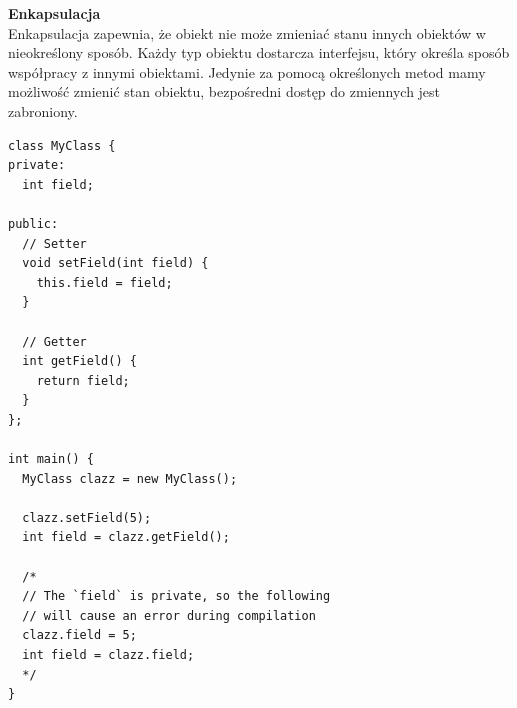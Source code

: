 \documentclass[12pt]{article}
\begin{document}
    \begin{definition}
    \textbf{Enkapsulacja} \\
    Enkapsulacja zapewnia, że obiekt nie może zmieniać stanu innych obiektów w nieokreślony sposób.
    Każdy typ obiektu dostarcza interfejsu, który określa sposób współpracy z innymi obiektami.
    Jedynie za pomocą określonych metod mamy możliwość zmienić stan obiektu, bezpośredni dostęp
    do zmiennych jest zabroniony.
    \begin{verbatim}
class MyClass {
private:
  int field;
  
public:
  // Setter
  void setField(int field) {
    this.field = field;
  }
  
  // Getter
  int getField() {
    return field;
  }
};

int main() {
  MyClass clazz = new MyClass();
  
  clazz.setField(5);
  int field = clazz.getField();
  
  /*
  // The `field` is private, so the following
  // will cause an error during compilation
  clazz.field = 5;
  int field = clazz.field;
  */
}
    \end{verbatim}
    \end{definition}
    
\end{document}
